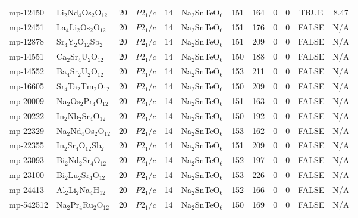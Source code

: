 {\begin{longtable}{llcccccccccc}
    mp-12450 & Li$_{2}$Nd$_{4}$Os$_{2}$O$_{12}$ & 20    & $P2_1/c$ & 14    & Na$_{2}$SnTeO$_{6}$ & 151   & 164   & 0     & 0     & TRUE  & 8.47  \\
    mp-12451 & La$_{4}$Li$_{2}$Os$_{2}$O$_{12}$ & 20    & $P2_1/c$ & 14    & Na$_{2}$SnTeO$_{6}$ & 151   & 176   & 0     & 0     & FALSE & N/A \\
    mp-12878 & Sr$_{4}$Y$_{2}$O$_{12}$Sb$_{2}$ & 20    & $P2_1/c$ & 14    & Na$_{2}$SnTeO$_{6}$ & 151   & 209   & 0     & 0     & FALSE & N/A \\
    mp-14551 & Ca$_{2}$Sr$_{4}$U$_{2}$O$_{12}$ & 20    & $P2_1/c$ & 14    & Na$_{2}$SnTeO$_{6}$ & 150   & 188   & 0     & 0     & FALSE & N/A \\
    mp-14552 & Ba$_{4}$Sr$_{2}$U$_{2}$O$_{12}$ & 20    & $P2_1/c$ & 14    & Na$_{2}$SnTeO$_{6}$ & 153   & 211   & 0     & 0     & FALSE & N/A \\
    mp-16605 & Sr$_{4}$Ta$_{2}$Tm$_{2}$O$_{12}$ & 20    & $P2_1/c$ & 14    & Na$_{2}$SnTeO$_{6}$ & 150   & 209   & 0     & 0     & FALSE & N/A \\
    mp-20009 & Na$_{2}$Os$_{2}$Pr$_{4}$O$_{12}$ & 20    & $P2_1/c$ & 14    & Na$_{2}$SnTeO$_{6}$ & 151   & 163   & 0     & 0     & FALSE & N/A \\
    mp-20222 & In$_{2}$Nb$_{2}$Sr$_{4}$O$_{12}$ & 20    & $P2_1/c$ & 14    & Na$_{2}$SnTeO$_{6}$ & 150   & 192   & 0     & 0     & FALSE & N/A \\
    mp-22329 & Na$_{2}$Nd$_{4}$Os$_{2}$O$_{12}$ & 20    & $P2_1/c$ & 14    & Na$_{2}$SnTeO$_{6}$ & 153   & 162   & 0     & 0     & FALSE & N/A \\
    mp-22355 & In$_{2}$Sr$_{4}$O$_{12}$Sb$_{2}$ & 20    & $P2_1/c$ & 14    & Na$_{2}$SnTeO$_{6}$ & 151   & 209   & 0     & 0     & FALSE & N/A \\
    mp-23093 & Bi$_{2}$Nd$_{2}$Sr$_{4}$O$_{12}$ & 20    & $P2_1/c$ & 14    & Na$_{2}$SnTeO$_{6}$ & 152   & 197   & 0     & 0     & FALSE & N/A \\
    mp-23100 & Bi$_{2}$Lu$_{2}$Sr$_{4}$O$_{12}$ & 20    & $P2_1/c$ & 14    & Na$_{2}$SnTeO$_{6}$ & 153   & 226   & 0     & 0     & FALSE & N/A \\
    mp-24413 & Al$_{2}$Li$_{2}$Na$_{4}$H$_{12}$ & 20    & $P2_1/c$ & 14    & Na$_{2}$SnTeO$_{6}$ & 152   & 166   & 0     & 0     & FALSE & N/A \\
    mp-542512 & Na$_{2}$Pr$_{4}$Ru$_{2}$O$_{12}$ & 20    & $P2_1/c$ & 14    & Na$_{2}$SnTeO$_{6}$ & 150   & 169   & 0     & 0     & FALSE & N/A \\

\end{longtable}}
